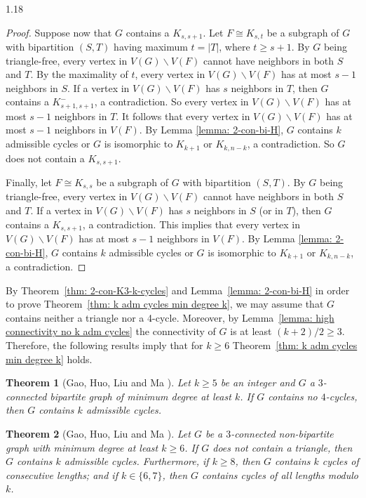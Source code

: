 \documentclass[10pt]{article}
\newtheorem{theorem}{Theorem}[section]
\let\geq\geqslant
\begin{document}
\begin{spacing}{1.18}
\begin{proof}
    Suppose now that $G$ contains a $K_{s,s+1}$. Let $F \cong K_{s,t}$ be a subgraph of $G$ with bipartition $(S,T)$ having maximum $t=|T|$, where $t\geqslant s+1$. By $G$ being triangle-free, every vertex in $V(G)\backslash V(F)$ cannot have neighbors in both $S$ and $T$. By the maximality of $t$, every vertex in $V(G)\backslash V(F)$ has at most $s-1$ neighbors in $S$. If a vertex in $V(G)\backslash V(F)$ has $s$ neighbors in $T$, then $G$ contains a $K_{s+1,s+1}^-$, a contradiction. So every vertex in $V(G)\backslash V(F)$ has at most $s-1$ neighbors in $T$. It follows that every vertex in $V(G)\backslash V(F)$ has at most $s-1$ neighbors in $V(F)$. By Lemma \ref{lemma: 2-con-bi-H}, $G$ contains $k$ admissible cycles or $G$ is isomorphic to $K_{k+1}$ or $K_{k,n-k}$, a contradiction. So $G$ does not contain a $K_{s,s+1}$. 
    
    Finally, let $F \cong K_{s,s}$ be a subgraph of $G$ with bipartition $(S,T)$. By $G$ being triangle-free, every vertex in $V(G)\backslash V(F)$ cannot have neighbors in both $S$ and $T$. If a vertex in $V(G)\backslash V(F)$ has $s$ neighbors in $S$ (or in $T$), then $G$ contains a $K_{s,s+1}$, a contradiction. This implies that every vertex in $V(G)\backslash V(F)$ has at most $s-1$ neighbors in $V(F)$. By Lemma \ref{lemma: 2-con-bi-H}, $G$ contains $k$ admissible cycles or $G$ is isomorphic to $K_{k+1}$ or $K_{k,n-k}$, a contradiction.
\end{proof}

By Theorem~\ref{thm: 2-con-K3-k-cycles} and Lemma~\ref{lemma: 2-con-bi-H} in order to prove Theorem~\ref{thm: k adm cycles min degree k}, we may assume that $G$ contains neither a triangle nor a 4-cycle. Moreover, by Lemma~\ref{lemma: high connectivity no k adm cycles} the connectivity of $G$ is at least $(k+2)/2 \geq 3$. Therefore, the following results imply that for $k\geqslant 6$ Theorem~\ref{thm: k adm cycles min degree k} holds.

\begin{theorem}[Gao, Huo, Liu and Ma \cite{G+22}]\label{thm: 3-con-bi}
    Let $k\geqslant 5$ be an integer and $G$ a $3$-connected bipartite graph of minimum degree at least $k$. If $G$ contains no $4$-cycles, then $G$ contains $k$ admissible cycles.
\end{theorem}

\begin{theorem}[Gao, Huo, Liu and Ma \cite{G+22}]\label{thm: 3-con-noK3-k-cycles}
    Let $G$ be a $3$-connected non-bipartite graph with minimum degree at least $k\geqslant 6$. If $G$ does not contain a triangle, then $G$ contains $k$ admissible cycles. Furthermore, if $k\geqslant 8$, then $G$ contains $k$ cycles of consecutive lengths; and if $k\in \{6, 7\}$, then $G$ contains cycles of all lengths modulo $k$.
\end{theorem}


\end{spacing}
\end{document}
